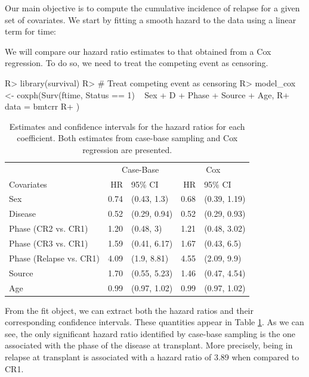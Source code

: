 \documentclass[
]{jss}
\begin{document}
Our main objective is to compute the cumulative incidence of relapse for
a given set of covariates. We start by fitting a smooth hazard to the
data using a linear term for time:

We will compare our hazard ratio estimates to that obtained from a Cox
regression. To do so, we need to treat the competing event as censoring.

\begin{CodeChunk}

\begin{CodeInput}
R> library(survival)
R> # Treat competing event as censoring
R> model_cox <- coxph(Surv(ftime, Status == 1) ~ Sex + D + Phase + Source + Age,
R+   data = bmtcrr
R+ )
\end{CodeInput}
\end{CodeChunk}

\begin{CodeChunk}
\begin{table}

\caption{\label{tab:bmtcrr-cis}Estimates and confidence intervals for the hazard ratios for each coefficient. Both estimates from case-base sampling and Cox regression are presented.}
\centering
\begin{tabular}[t]{lrlrl}
\toprule
\multicolumn{1}{c}{ } & \multicolumn{2}{c}{Case-Base} & \multicolumn{2}{c}{Cox} \\
\cmidrule(l{3pt}r{3pt}){2-3} \cmidrule(l{3pt}r{3pt}){4-5}
Covariates & HR & 95\% CI & HR & 95\% CI\\
\midrule
Sex & 0.74 & (0.43, 1.3) & 0.68 & (0.39, 1.19)\\
Disease & 0.52 & (0.29, 0.94) & 0.52 & (0.29, 0.93)\\
Phase (CR2 vs. CR1) & 1.20 & (0.48, 3) & 1.21 & (0.48, 3.02)\\
Phase (CR3 vs. CR1) & 1.59 & (0.41, 6.17) & 1.67 & (0.43, 6.5)\\
Phase (Relapse vs. CR1) & 4.09 & (1.9, 8.81) & 4.55 & (2.09, 9.9)\\
\addlinespace
Source & 1.70 & (0.55, 5.23) & 1.46 & (0.47, 4.54)\\
Age & 0.99 & (0.97, 1.02) & 0.99 & (0.97, 1.02)\\
\bottomrule
\end{tabular}
\end{table}

\end{CodeChunk}

From the fit object, we can extract both the hazard ratios and their
corresponding confidence intervals. These quantities appear in Table
\ref{tab:bmtcrr-cis}. As we can see, the only significant hazard ratio
identified by case-base sampling is the one associated with the phase of
the disease at transplant. More precisely, being in relapse at
transplant is associated with a hazard ratio of 3.89 when compared to
CR1.
\end{document}
